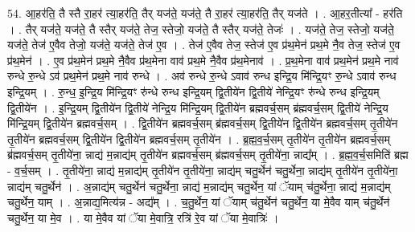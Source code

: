 \documentclass[17pt]{extarticle}
\begin{document}
54. आ॒हर॑ति॒ तै स्तै रा॒हर॑ त्या॒हर॑ति॒ तैर् यज॑ते॒ यज॑ते॒ तै रा॒हर॑ त्या॒हर॑ति॒ तैर् यज॑ते । . आ॒हर॒तीत्या᳚ - हर॑ति । . तैर् यज॑ते॒ यज॑ते॒ तै स्तैर् यज॑ते॒ तेज॒ स्तेजो॒ यज॑ते॒ तै स्तैर् यज॑ते॒ तेजः॑ । . यज॑ते॒ तेज॒ स्तेजो॒ यज॑ते॒ यज॑ते॒ तेज॑ ए॒वैव तेजो॒ यज॑ते॒ यज॑ते॒ तेज॑ ए॒व । . तेज॑ ए॒वैव तेज॒ स्तेज॑ ए॒व प्र॑थ॒मेन॑ प्रथ॒मे नै॒व तेज॒ स्तेज॑ ए॒व प्र॑थ॒मेन॑ । . ए॒व प्र॑थ॒मेन॑ प्रथ॒मे नै॒वैव प्र॑थ॒मेना वाव॑ प्रथ॒मे नै॒वैव प्र॑थ॒मेनाव॑ । . प्र॒थ॒मेना वाव॑ प्रथ॒मेन॑ प्रथ॒मे नाव॑ रुन्धे रु॒न्धे ऽव॑ प्रथ॒मेन॑ प्रथ॒मे नाव॑ रुन्धे । . अव॑ रुन्धे रु॒न्धे ऽवाव॑ रुन्ध इन्द्रि॒य मि॑न्द्रि॒यꣳ रु॒न्धे ऽवाव॑ रुन्ध इन्द्रि॒यम् । . रु॒न्ध॒ इ॒न्द्रि॒य मि॑न्द्रि॒यꣳ रु॑न्धे रुन्ध इन्द्रि॒यम् द्वि॒तीये॑न द्वि॒तीये॑ नेन्द्रि॒यꣳ रु॑न्धे रुन्ध इन्द्रि॒यम् द्वि॒तीये॑न । . इ॒न्द्रि॒यम् द्वि॒तीये॑न द्वि॒तीये॑ नेन्द्रि॒य मि॑न्द्रि॒यम् द्वि॒तीये॑न ब्रह्मवर्च॒सम् ब्र॑ह्मवर्च॒सम् द्वि॒तीये॑ 
नेन्द्रि॒य मि॑न्द्रि॒यम् द्वि॒तीये॑न ब्रह्मवर्च॒सम् । . द्वि॒तीये॑न ब्रह्मवर्च॒सम् ब्र॑ह्मवर्च॒सम् द्वि॒तीये॑न द्वि॒तीये॑न ब्रह्मवर्च॒सम् तृ॒तीये॑न तृ॒तीये॑न ब्रह्मवर्च॒सम् द्वि॒तीये॑न द्वि॒तीये॑न ब्रह्मवर्च॒सम् तृ॒तीये॑न । . ब्र॒ह्म॒व॒र्च॒सम् तृ॒तीये॑न तृ॒तीये॑न ब्रह्मवर्च॒सम् ब्र॑ह्मवर्च॒सम् तृ॒तीये॑ना॒ न्नाद्य॑ म॒न्नाद्य॑म् तृ॒तीये॑न ब्रह्मवर्च॒सम् ब्र॑ह्मवर्च॒सम् तृ॒तीये॑ना॒ न्नाद्य᳚म् । . ब्र॒ह्म॒व॒र्च॒समिति॑ ब्रह्म - व॒र्च॒सम् । . तृ॒तीये॑ना॒ न्नाद्य॑ म॒न्नाद्य॑म् तृ॒तीये॑न तृ॒तीये॑ना॒ न्नाद्य॑म् चतु॒र्थेन॑ चतु॒र्थेना॒ न्नाद्य॑म् तृ॒तीये॑न तृ॒तीये॑ना॒ न्नाद्य॑म् चतु॒र्थेन॑ । . अ॒न्नाद्य॑म् चतु॒र्थेन॑ चतु॒र्थेना॒ न्नाद्य॑ म॒न्नाद्य॑म् चतु॒र्थेन॒ यां ॅयाम् च॑तु॒र्थेना॒ न्नाद्य॑ म॒न्नाद्य॑म् चतु॒र्थेन॒ याम् । . अ॒न्नाद्य॒मित्य॑न्न - अद्य᳚म् । . च॒तु॒र्थेन॒ यां ॅयाम् च॑तु॒र्थेन॑ चतु॒र्थेन॒ या मे॒वैव याम् च॑तु॒र्थेन॑ चतु॒र्थेन॒ या मे॒व । . या मे॒वैव यां ॅया मे॒वात्रि॒ रत्रि॑ रे॒व यां ॅया मे॒वात्रिः॑ । \newline
\end{document}
